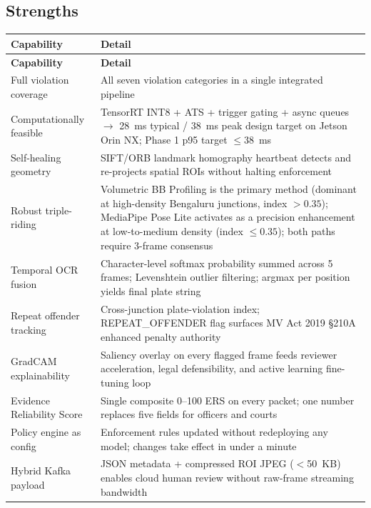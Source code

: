 \documentclass[11pt,a4paper]{article}
\begin{document}
\subsection*{Strengths}

\begin{longtable}{L{4cm} L{11cm}}
    \toprule
    \color{white}\textbf{Capability} & \color{white}\textbf{Detail} \\
    \midrule
    \endfirsthead
    \toprule
    \color{white}\textbf{Capability} & \color{white}\textbf{Detail} \\
    \midrule
    \endhead
    \bottomrule
    \endfoot

    Full violation coverage & All seven violation categories in a single integrated pipeline \\
    Computationally feasible & TensorRT INT8 + ATS + trigger gating + async queues $\rightarrow$ 28~ms typical / 38~ms peak design target on Jetson Orin NX; Phase 1 p95 target $\leq 38$~ms \\
    Self-healing geometry & SIFT/ORB landmark homography heartbeat detects and re-projects spatial ROIs without halting enforcement \\
    Robust triple-riding & Volumetric BB Profiling is the primary method (dominant at high-density Bengaluru junctions, index $> 0.35$); MediaPipe Pose Lite activates as a precision enhancement at low-to-medium density (index $\leq 0.35$); both paths require 3-frame consensus \\
    Temporal OCR fusion & Character-level softmax probability summed across 5 frames; Levenshtein outlier filtering; argmax per position yields final plate string \\
    Repeat offender tracking & Cross-junction plate-violation index; REPEAT\_OFFENDER flag surfaces MV Act 2019 \S210A enhanced penalty authority \\
    GradCAM explainability & Saliency overlay on every flagged frame feeds reviewer acceleration, legal defensibility, and active learning fine-tuning loop \\
    Evidence Reliability Score & Single composite 0--100 ERS on every packet; one number replaces five fields for officers and courts \\
    Policy engine as config & Enforcement rules updated without redeploying any model; changes take effect in under a minute \\
    Hybrid Kafka payload & JSON metadata + compressed ROI JPEG ($<$50~KB) enables cloud human review without raw-frame streaming bandwidth \\
\end{longtable}
\end{document}
